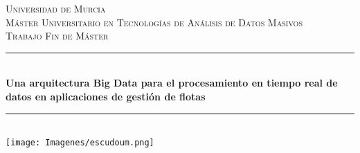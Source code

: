 \documentclass[12pt,twoside,openany]{report}     %
\begin{document}
        \begin{titlepage}

                \newcommand{\HRule}{\rule{\linewidth}{0.5mm}} %

                \center %


                \textsc{\LARGE Universidad de Murcia}\\[1.5cm] %
                \textsc{\Large Máster Universitario en Tecnologías de Análisis de Datos Masivos}\\[0.5cm] %
                \textsc{\large Trabajo Fin de Máster}\\[0.5cm] %


                \HRule \\[0.4cm]
                { \huge \bfseries Una arquitectura Big Data para el procesamiento en tiempo real de datos en aplicaciones de gestión de flotas
                        }\\[0.4cm] %
                \HRule \\[1cm]


                \texttt{[image: Imagenes/escudoum.png]}\\[2cm] %



\end{titlepage}
\end{document}
